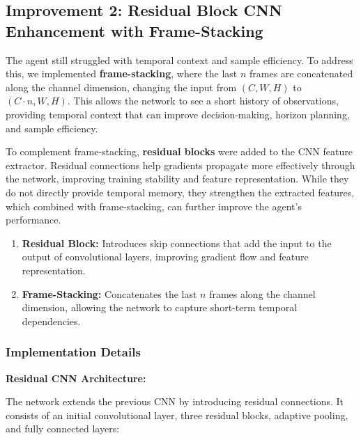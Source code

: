 \documentclass[twocolumn]{article}
\begin{document}
\subsection*{Improvement 2: Residual Block CNN Enhancement with Frame-Stacking}

The agent still struggled with temporal context and sample efficiency. To address this, we implemented \textbf{frame-stacking}, where the last $n$ frames are concatenated along the channel dimension, changing the input from $(C, W, H)$ to $(C \cdot n, W, H)$. This allows the network to see a short history of observations, providing temporal context that can improve decision-making, horizon planning, and sample efficiency.

To complement frame-stacking, \textbf{residual blocks} were added to the CNN feature extractor. Residual connections help gradients propagate more effectively through the network, improving training stability and feature representation. While they do not directly provide temporal memory, they strengthen the extracted features, which combined with frame-stacking, can further improve the agent's performance.

\begin{enumerate}
	\item \textbf{Residual Block:} Introduces skip connections that add the input to the output of convolutional layers, improving gradient flow and feature representation.
	\item \textbf{Frame-Stacking:} Concatenates the last $n$ frames along the channel dimension, allowing the network to capture short-term temporal dependencies.
\end{enumerate}

\subsubsection*{Implementation Details}

\textbf{Residual CNN Architecture:}

The network extends the previous CNN by introducing residual connections. It consists of an initial convolutional layer, three residual blocks, adaptive pooling, and fully connected layers:
\end{document}
